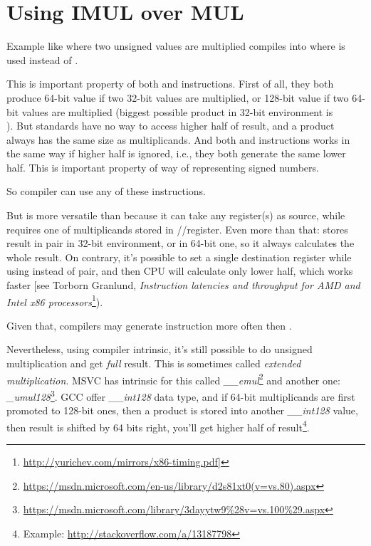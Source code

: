 \section{Using IMUL over MUL}
\label{IMUL_over_MUL}

Example like  where two unsigned values are multiplied compiles into  where \IMUL is used instead of \MUL.

This is important property of both \MUL and \IMUL instructions.
First of all, they both produce 64-bit value if two 32-bit values are multiplied, or 128-bit value if two 64-bit values are multiplied (biggest possible \gls{product} in 32-bit environment is \\
).
But \CCpp standards have no way to access higher half of result, and a \gls{product} always has the same size as multiplicands. %
And both \MUL and \IMUL instructions works in the same way if higher half is ignored, i.e., they both generate
the same lower half.
This is important property of  way of representing signed numbers.

So \CCpp compiler can use any of these instructions.

But \IMUL is more versatile than \MUL because it can take any register(s) as source, while \MUL requires one of multiplicands stored in \AX/\EAX/\RAX register.
Even more than that: \MUL stores result in  pair in 32-bit environment, or  in 64-bit one, so it always calculates the whole result.
On contrary, it's possible to set a single destination register while using \IMUL instead of pair, and then \ac{CPU} will calculate only lower half, which works faster [see Torborn Granlund, \emph{Instruction latencies and throughput for AMD and Intel x86 processors}\footnote{\url{http://yurichev.com/mirrors/x86-timing.pdf}]}).

Given that, \CCpp compilers may generate \IMUL instruction more often then \MUL.

Nevertheless, using compiler intrinsic, it's still possible to do unsigned multiplication and get \emph{full} result.
This is sometimes called \emph{extended multiplication}.
MSVC has intrinsic for this called \emph{\_\_emul}\footnote{\url{https://msdn.microsoft.com/en-us/library/d2s81xt0(v=vs.80).aspx}} and another one: \emph{\_umul128}\footnote{\url{https://msdn.microsoft.com/library/3dayytw9%28v=vs.100%29.aspx}}.
GCC offer \emph{\_\_int128} data type, and if 64-bit multiplicands are first promoted to 128-bit ones,
then a \gls{product} is stored into another \emph{\_\_int128} value, then result is shifted by 64 bits right,
you'll get higher half of result\footnote{Example: \url{http://stackoverflow.com/a/13187798}}.


